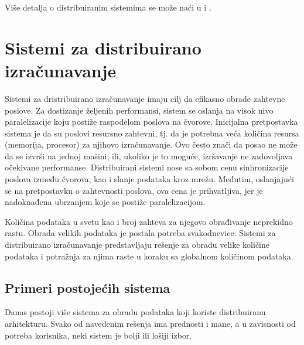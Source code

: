 \documentclass[12pt,oneside]{memoir}
\begin{document}
Više detalja o distribuiranim sistemima se može naći u \cite{ElementsOfDistributedComputing} i \cite{DistributedComputing}.

\section{Sistemi za distribuirano izračunavanje}

Sistemi za dristribuirano izračunavanje imaju cilj da efikasno obrade zahtevne poslove. Za dostizanje željenih performansi, sistem se oslanja na visok nivo paralelizacije koju postiže raspodelom poslova na čvorove. Inicijalna pretpostavka sistema je da su poslovi resursno zahtevni, tj. da je potrebna veća količina resursa (memorija, procesor) za njihovo izračunavanje. Ovo često znači da posao ne može da se izvrši na jednoj mašini, ili, ukoliko je to moguće, izršavanje ne zadovoljava očekivane performanse. Distribuirani sistemi nose sa sobom cenu sinhronizacije poslova između čvorova, kao i slanje podataka kroz mrežu. Međutim, oslanjajući se na pretpostavku o zahtevnosti poslova, ova cena je prihvatljiva, jer je nadoknađena ubrzanjem koje se postiže paralelizacijom.

Količina podataka u svetu kao i broj zahteva za njegovo obrađivanje neprekidno rastu. Obrada velikih podataka je postala potreba svakodnevice. Sistemi za distribuirano izračunavanje predstavljaju rešenje za obradu velike količine podataka i potražnja za njima raste u koraku sa globalnom količinom podataka.

\subsection{Primeri postojećih sistema}
\label{sub:postojeca_resenja}

Danas postoji više sistema za obradu podataka koji koriste distribuiranu arhitekturu. Svako od navedenim rešenja ima prednosti i mane, a u zavisnosti od potreba korisnika, neki sistem je bolji ili lošiji izbor.
\end{document}
